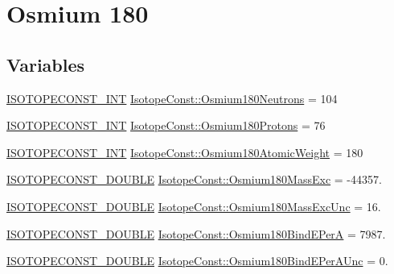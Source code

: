 \hypertarget{group___isotope_const-_osmium-_os180}{}\section{Osmium 180}
\label{group___isotope_const-_osmium-_os180}
\subsection*{Variables}
\begin{DoxyCompactItemize}
\item 
\mbox{\hyperlink{group___isotope_const-_macros_ga5f18360b3e99483a35c32d789e62621c}{I\+S\+O\+T\+O\+P\+E\+C\+O\+N\+S\+T\+\_\+\+I\+NT}} \mbox{\hyperlink{group___isotope_const-_osmium-_os180_gaa1cd960826cf1d2667b941c49c7b88a2}{Isotope\+Const\+::\+Osmium180\+Neutrons}} = 104
\item 
\mbox{\hyperlink{group___isotope_const-_macros_ga5f18360b3e99483a35c32d789e62621c}{I\+S\+O\+T\+O\+P\+E\+C\+O\+N\+S\+T\+\_\+\+I\+NT}} \mbox{\hyperlink{group___isotope_const-_osmium-_os180_ga88124bd0679083cbf4f8058367e43d2d}{Isotope\+Const\+::\+Osmium180\+Protons}} = 76
\item 
\mbox{\hyperlink{group___isotope_const-_macros_ga5f18360b3e99483a35c32d789e62621c}{I\+S\+O\+T\+O\+P\+E\+C\+O\+N\+S\+T\+\_\+\+I\+NT}} \mbox{\hyperlink{group___isotope_const-_osmium-_os180_ga3be5220b15f557687b3f55e152dd5d87}{Isotope\+Const\+::\+Osmium180\+Atomic\+Weight}} = 180
\item 
\mbox{\hyperlink{group___isotope_const-_macros_ga8f45a7272ce02c0b4c65c44636ed719a}{I\+S\+O\+T\+O\+P\+E\+C\+O\+N\+S\+T\+\_\+\+D\+O\+U\+B\+LE}} \mbox{\hyperlink{group___isotope_const-_osmium-_os180_gaef391898f3a5bc2cf0cf47e62c1d7d26}{Isotope\+Const\+::\+Osmium180\+Mass\+Exc}} = -\/44357.
\item 
\mbox{\hyperlink{group___isotope_const-_macros_ga8f45a7272ce02c0b4c65c44636ed719a}{I\+S\+O\+T\+O\+P\+E\+C\+O\+N\+S\+T\+\_\+\+D\+O\+U\+B\+LE}} \mbox{\hyperlink{group___isotope_const-_osmium-_os180_ga69f2d8edef8cc2b2a4da3aa32efa53f3}{Isotope\+Const\+::\+Osmium180\+Mass\+Exc\+Unc}} = 16.
\item 
\mbox{\hyperlink{group___isotope_const-_macros_ga8f45a7272ce02c0b4c65c44636ed719a}{I\+S\+O\+T\+O\+P\+E\+C\+O\+N\+S\+T\+\_\+\+D\+O\+U\+B\+LE}} \mbox{\hyperlink{group___isotope_const-_osmium-_os180_ga0b1144987e822455d34d60739719c0f2}{Isotope\+Const\+::\+Osmium180\+Bind\+E\+PerA}} = 7987.
\item 
\mbox{\hyperlink{group___isotope_const-_macros_ga8f45a7272ce02c0b4c65c44636ed719a}{I\+S\+O\+T\+O\+P\+E\+C\+O\+N\+S\+T\+\_\+\+D\+O\+U\+B\+LE}} \mbox{\hyperlink{group___isotope_const-_osmium-_os180_ga4effea11e3b00d477d958121729c6235}{Isotope\+Const\+::\+Osmium180\+Bind\+E\+Per\+A\+Unc}} = 0.

\end{DoxyCompactItemize}
